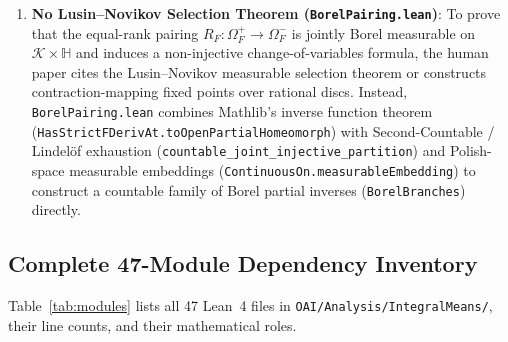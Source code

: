 \documentclass[11pt,reqno]{amsart}
\theoremstyle{definition}
\newcommand{\uhp}{\mathbb{H}}
\newcommand{\Kclass}{\mathcal{K}}
\begin{document}
\begin{enumerate}[label=\textbf{Bypass \arabic*.},leftmargin=*]
\item \textbf{No Lusin--Novikov Selection Theorem (\texttt{BorelPairing.lean})}:
To prove that the equal-rank pairing $R_F : \Omega_F^+ \to \Omega_F^-$ is jointly Borel measurable on $\Kclass \times \uhp$ and induces a non-injective change-of-variables formula, the human paper cites the Lusin--Novikov measurable selection theorem or constructs contraction-mapping fixed points over rational discs. Instead, \texttt{BorelPairing.lean} combines Mathlib's inverse function theorem (\texttt{HasStrictFDerivAt.toOpenPartialHomeomorph}) with Second-Countable / Lindel\"of exhaustion (\texttt{countable\_joint\_injective\_partition}) and Polish-space measurable embeddings (\texttt{ContinuousOn.measurableEmbedding}) to construct a countable family of Borel partial inverses (\texttt{BorelBranches}) directly.
\end{enumerate}

\subsection{Complete 47-Module Dependency Inventory}

Table~\ref{tab:modules} lists all 47 Lean~4 files in \texttt{OAI/Analysis/IntegralMeans/}, their line counts, and their mathematical roles.
\end{document}
